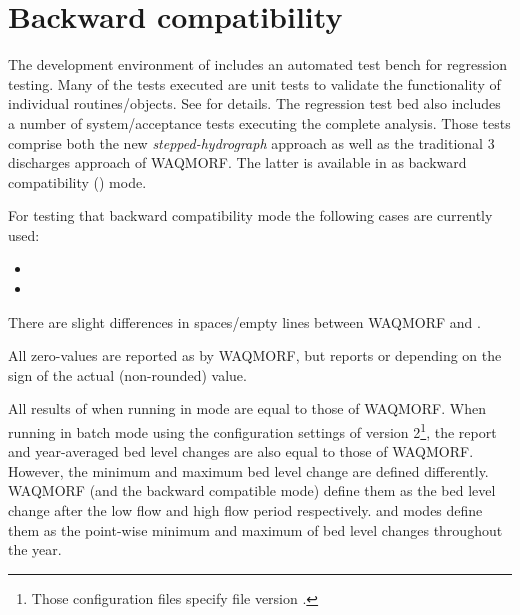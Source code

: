 \chapter{Backward compatibility} \label{Chp:Backward}

The development environment of \dfastmi includes an automated test bench for regression testing.
Many of the tests executed are unit tests to validate the functionality of individual routines/objects.
See \citet{trm} for details.
The regression test bed also includes a number of system/acceptance tests executing the complete \dfmi analysis.
Those tests comprise both the new \emph{stepped-hydrograph} approach as well as the traditional 3 discharges approach of WAQMORF.
The latter is available in  as backward compatibility () mode.

For testing that backward compatibility mode the following cases are currently used:

\begin{itemize}
\item {}
\item {}
\end{itemize}

\begin{Remark}
\item There are slight differences in spaces/empty lines between WAQMORF and \dfmi.
\item All zero-values are reported as  by WAQMORF, but \dfmi reports  or  depending on the sign of the actual (non-rounded) value.
\item All results of \dfmi when running in  mode are equal to those of WAQMORF.
When \dfmi running in batch mode using the configuration settings of \dfmi version 2\footnote{Those configuration files specify file version .}, the report and year-averaged bed level changes are also equal to those of WAQMORF.
However, the minimum and maximum bed level change are defined differently.
WAQMORF (and the backward compatible \dfmi{}  mode) define them as the bed level change after the low flow and high flow period respectively.
\dfmi{}  and  modes define them as the point-wise minimum and maximum of bed level changes throughout the year.
\end{Remark}

